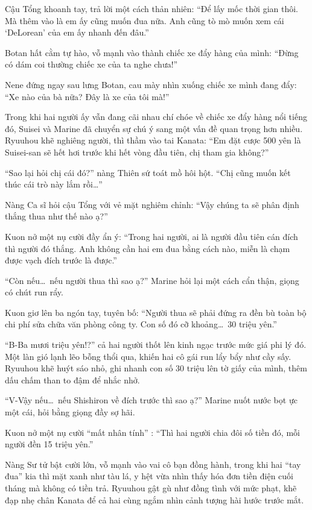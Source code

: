 \documentclass[../main.tex]{subfiles}
\begin{document}
Cậu Tổng khoanh tay, trả lời một cách thản nhiên: ``Để lấy mốc thời gian thôi. Mà thêm vào là em ấy cũng muốn đua nữa. Anh cũng tò mò muốn xem cái `DeLorean' của em ấy nhanh đến đâu.''

Botan hất cằm tự hào, vỗ mạnh vào thành chiếc xe đẩy hàng của mình: ``Đừng có dám coi thường chiếc xe của ta nghe chưa!''

Nene đứng ngay sau lưng Botan, cau mày nhìn xuống chiếc xe mình đang đẩy: ``Xe nào của bà nữa? Đây là xe của tôi mà!''

Trong khi hai người ấy vẫn đang cãi nhau chí chóe về chiếc xe đẩy hàng nổi tiếng đó, Suisei và Marine đã chuyển sự chú ý sang một vấn đề quan trọng hơn nhiều. Ryuuhou khẽ nghiêng người, thì thầm vào tai Kanata: ``Em đặt cược 500 yên là Suisei-san sẽ hết hơi trước khi hết vòng đầu tiên, chị tham gia không?''

``Sao lại hỏi chị cái đó?'' nàng Thiên sứ toát mồ hôi hột. ``Chị cũng muốn kết thúc cái trò này lắm rồi\dots''

Nàng Ca sĩ hỏi cậu Tổng với vẻ mặt nghiêm chỉnh: ``Vậy chúng ta sẽ phân định thắng thua như thế nào ạ?''

Kuon nở một nụ cười đầy ẩn ý: ``Trong hai người, ai là người đầu tiên cán đích thì người đó thắng. Anh không cần hai em đua bằng cách nào, miễn là chạm được vạch đích trước là được.''

``Còn nếu\dots\ nếu người thua thì sao ạ?'' Marine hỏi lại một cách cẩn thận, giọng có chút run rẩy.

Kuon giơ lên ba ngón tay, tuyên bố: ``Người thua sẽ phải đứng ra đền bù toàn bộ chi phí sửa chữa văn phòng công ty. Con số đó cỡ khoảng\dots\ 30 triệu yên.''

``B-Ba mươi triệu yên!?'' cả hai người thốt lên kinh ngạc trước mức giá phi lý đó. Một làn gió lạnh lẽo bỗng thổi qua, khiến hai cô gái run lẩy bẩy như cầy sấy. Ryuuhou khẽ huýt sáo nhỏ, ghi nhanh con số 30 triệu lên tờ giấy của mình, thêm dấu chấm than to đậm để nhắc nhở.

``V-Vậy nếu\dots\ nếu Shishiron về đích trước thì sao ạ?'' Marine nuốt nước bọt ực một cái, hỏi bằng giọng đầy sợ hãi.

Kuon nở một nụ cười ``mất nhân tính'' : ``Thì hai người chia đôi số tiền đó, mỗi người đền 15 triệu yên.''

Nàng Sư tử bật cười lớn, vỗ mạnh vào vai cô bạn đồng hành, trong khi hai ``tay đua'' kia thì mặt xanh như tàu lá, y hệt vừa nhìn thấy hóa đơn tiền điện cuối tháng mà không có tiền trả. Ryuuhou gật gù như đồng tình với mức phạt, khẽ đạp nhẹ chân Kanata để cả hai cùng ngắm nhìn cảnh tượng hài hước trước mắt.
\end{document}
